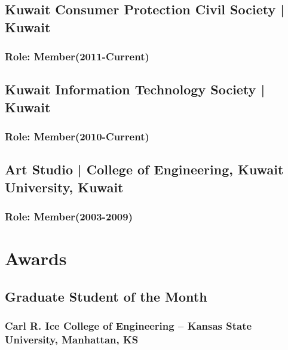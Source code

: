 \documentclass[11pt]{article}
\begin{document}
\subsection{Kuwait Consumer Protection Civil Society | \normalfont Kuwait  }
\subsubsection{\normalfont Role: Member(2011-Current)}
\vspace{0.5em} %

\subsection{Kuwait Information Technology Society | \normalfont Kuwait  }
\subsubsection{ \normalfont Role: Member(2010-Current)}
\vspace{0.5em} %

\subsection{Art Studio | \normalfont College of Engineering, Kuwait University, Kuwait  }
\subsubsection{\normalfont Role: Member(2003-2009)}


\vspace{2em} %


\section{Awards} %
\subsection{Graduate Student of the Month {\href{https://engg.k-state.edu/research/graduate-student/student-of-the-month/february/}{\color{icnclr} \faGlobe[regular] }}}
\subsubsection{Carl R. Ice College of Engineering – Kansas State University, Manhattan, KS }
\vspace{.5em} %
\end{document}
